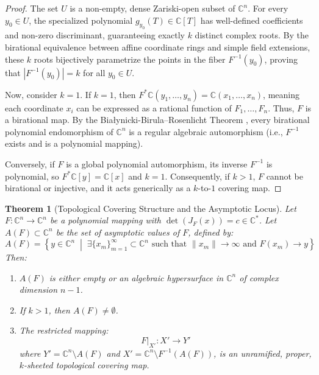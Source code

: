 \documentclass[11pt,reqno]{amsart}
\newtheorem{theorem}{Theorem}[section]
\theoremstyle{definition}
\begin{document}
\begin{proof}
The set $U$ is a non-empty, dense Zariski-open subset of $\mathbb{C}^n$. For every $y_0 \in U$, the specialized polynomial $g_{y_0}(T) \in \mathbb{C}[T]$ has well-defined coefficients and non-zero discriminant, guaranteeing exactly $k$ distinct complex roots. By the birational equivalence between affine coordinate rings and simple field extensions, these $k$ roots bijectively parametrize the points in the fiber $F^{-1}(y_0)$, proving that $|F^{-1}(y_0)| = k$ for all $y_0 \in U$.

Now, consider $k = 1$. If $k = 1$, then $F^*\mathbb{C}(y_1, \dots, y_n) = \mathbb{C}(x_1, \dots, x_n)$, meaning each coordinate $x_i$ can be expressed as a rational function of $F_1, \dots, F_n$. Thus, $F$ is a birational map. By the Białynicki-Birula--Rosenlicht Theorem \cite{BR1962}, every birational polynomial endomorphism of $\mathbb{C}^n$ is a regular algebraic automorphism (i.e., $F^{-1}$ exists and is a polynomial mapping). 

Conversely, if $F$ is a global polynomial automorphism, its inverse $F^{-1}$ is polynomial, so $F^* \mathbb{C}[y] = \mathbb{C}[x]$ and $k = 1$. Consequently, if $k > 1$, $F$ cannot be birational or injective, and it acts generically as a $k$-to-$1$ covering map.
\end{proof}

\begin{theorem}[Topological Covering Structure and the Asymptotic Locus]
Let $F: \mathbb{C}^n \to \mathbb{C}^n$ be a polynomial mapping with $\det(J_F(x)) = c \in \mathbb{C}^*$. Let $A(F) \subset \mathbb{C}^n$ be the set of asymptotic values of $F$, defined by:
$$A(F) = \left\{ y \in \mathbb{C}^n \;\middle|\; \exists \{x_m\}_{m=1}^\infty \subset \mathbb{C}^n \text{ such that } \|x_m\| \to \infty \text{ and } F(x_m) \to y \right\}$$
Then:
\begin{enumerate}
    \item $A(F)$ is either empty or an algebraic hypersurface in $\mathbb{C}^n$ of complex dimension $n-1$.
    \item If $k > 1$, then $A(F) \neq \emptyset$.
    \item The restricted mapping:
    $$F\big|_{X'}: X' \to Y'$$
    where $Y' = \mathbb{C}^n \setminus A(F)$ and $X' = \mathbb{C}^n \setminus F^{-1}(A(F))$, is an unramified, proper, $k$-sheeted topological covering map.
\end{enumerate}
\end{theorem}
\end{document}
